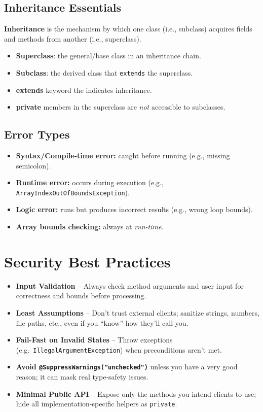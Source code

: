 \documentclass[11pt]{article}
\begin{document}
\subsection*{Inheritance Essentials}
\textbf{Inheritance} is the mechanism by which one class (i.e., subclass) acquires fields and methods from another (i.e., superclass).
\begin{itemize}
  \item \textbf{Superclass}: the general/base class in an inheritance chain.
  \item \textbf{Subclass}: the derived class that \texttt{extends} the superclass.
  \item \textbf{extends} keyword the indicates inheritance.
  \item \textbf{private} members in the superclass are \emph{not} accessible to subclasses.
\end{itemize}

\subsection*{Error Types}
\begin{itemize}
  \item \textbf{Syntax/Compile-time error:} caught before running (e.g., missing semicolon).
  \item \textbf{Runtime error:} occurs during execution (e.g., \texttt{ArrayIndexOutOfBoundsException}).
  \item \textbf{Logic error:} runs but produces incorrect results (e.g., wrong loop bounds).
  \item \textbf{Array bounds checking:} always at \emph{run-time}.
\end{itemize}

\section*{Security Best Practices}
\begin{itemize}
  \item \textbf{Input Validation} – Always check method arguments and user input for correctness and bounds before processing.
  \item \textbf{Least Assumptions} – Don’t trust external clients; sanitize strings, numbers, file paths, etc., even if you “know” how they’ll call you.
  \item \textbf{Fail-Fast on Invalid States} – Throw exceptions (e.g.\ \texttt{IllegalArgumentException}) when preconditions aren’t met.
  \item \textbf{Avoid \texttt{@SuppressWarnings("unchecked")}} unless you have a very good reason; it can mask real type‐safety issues.
  \item \textbf{Minimal Public API} – Expose only the methods you intend clients to use; hide all implementation-specific helpers as \texttt{private}.
\end{itemize}
\end{document}
